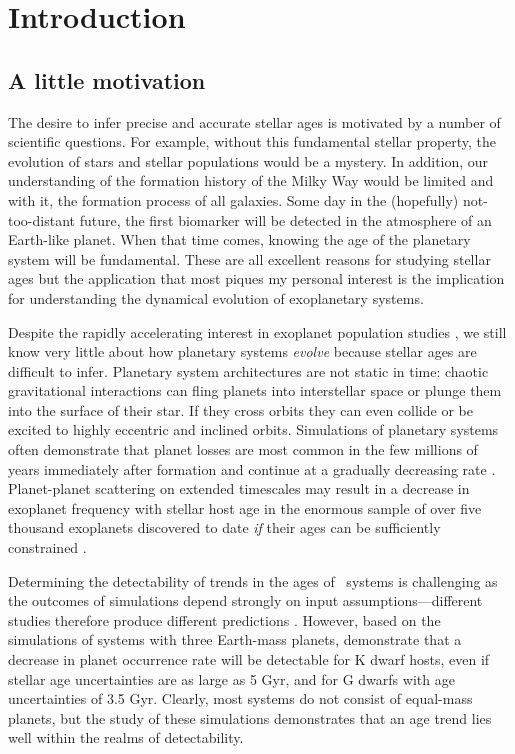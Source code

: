 \chapter{Introduction}
\label{chapter:intro}
\section{A little motivation}

The desire to infer precise and accurate stellar ages is motivated by a number
of scientific questions.
For example, without this fundamental stellar property, the evolution of stars
and stellar populations would be a mystery.
In addition, our understanding of the formation history of the Milky Way would
be limited and with it, the formation process of all galaxies.
Some day in the (hopefully) not-too-distant future, the first biomarker will
be detected in the atmosphere of an Earth-like planet.
When that time comes, knowing the age of the planetary system will be
fundamental.
These are all excellent reasons for studying stellar ages but the application
that most piques my personal interest is the implication for understanding
the dynamical evolution of exoplanetary systems.

Despite the rapidly accelerating interest in exoplanet population studies
\citep[e.g.][]{Petigura2013, Foreman-Mackey2014, Dressing2015, Burke2015}, we
still know very little about how planetary systems {\it evolve} because
stellar ages are difficult to infer.
Planetary system architectures are not static in time: chaotic gravitational
interactions can fling planets into interstellar space or plunge them into the
surface of their star.
If they cross orbits they can even collide or be excited to highly eccentric
and inclined orbits.
Simulations of planetary systems often demonstrate that planet losses are most
common in the few millions of years immediately after formation and continue
at a gradually decreasing rate \citep[e.g.][]{Zhou2007, Smith2009, Funk2010,
Pu2015}.
Planet-planet scattering on extended timescales may result in a decrease in
exoplanet frequency with stellar host age in the enormous sample of over five
thousand exoplanets discovered to date {\it if} their ages can be sufficiently
constrained \citep{Veras2015}.

Determining the detectability of trends in the ages of \Kepler\ systems is
challenging as the outcomes of simulations depend strongly on input
assumptions---different studies therefore produce different predictions
\citep[see figure 3 of][]{Pu2015}.
However, based on the \citet{Smith2009} simulations of systems with three
Earth-mass planets, \citet{Veras2015} demonstrate that a decrease in planet
occurrence rate will be detectable for K dwarf hosts, even if stellar age
uncertainties are as large as 5 Gyr, and for G dwarfs with age uncertainties of
3.5 Gyr.
Clearly, most systems do not consist of equal-mass planets, but the study
of these simulations demonstrates that an age trend lies well within the
realms of detectability.

